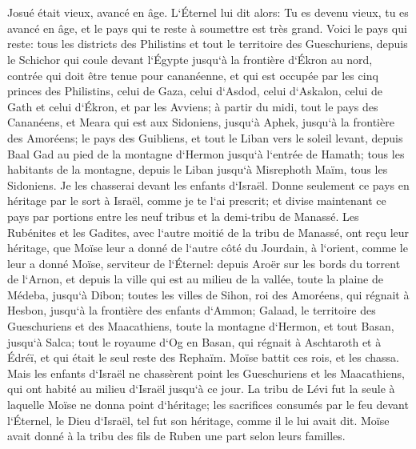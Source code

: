 \chapter{}

\verse Josué était vieux, avancé en âge. L`Éternel lui dit alors: Tu es devenu vieux, tu es avancé en âge, et le pays qui te reste à soumettre est très grand. 
\verse Voici le pays qui reste: tous les districts des Philistins et tout le territoire des Gueschuriens, 
\verse depuis le Schichor qui coule devant l`Égypte jusqu`à la frontière d`Ékron au nord, contrée qui doit être tenue pour cananéenne, et qui est occupée par les cinq princes des Philistins, celui de Gaza, celui d`Asdod, celui d`Askalon, celui de Gath et celui d`Ékron, et par les Avviens; 
\verse à partir du midi, tout le pays des Cananéens, et Meara qui est aux Sidoniens, jusqu`à Aphek, jusqu`à la frontière des Amoréens; 
\verse le pays des Guibliens, et tout le Liban vers le soleil levant, depuis Baal Gad au pied de la montagne d`Hermon jusqu`à l`entrée de Hamath; 
\verse tous les habitants de la montagne, depuis le Liban jusqu`à Misrephoth Maïm, tous les Sidoniens. Je les chasserai devant les enfants d`Israël. Donne seulement ce pays en héritage par le sort à Israël, comme je te l`ai prescrit; 
\verse et divise maintenant ce pays par portions entre les neuf tribus et la demi-tribu de Manassé. 
\verse Les Rubénites et les Gadites, avec l`autre moitié de la tribu de Manassé, ont reçu leur héritage, que Moïse leur a donné de l`autre côté du Jourdain, à l`orient, comme le leur a donné Moïse, serviteur de l`Éternel: 
\verse depuis Aroër sur les bords du torrent de l`Arnon, et depuis la ville qui est au milieu de la vallée, toute la plaine de Médeba, jusqu`à Dibon; 
\verse toutes les villes de Sihon, roi des Amoréens, qui régnait à Hesbon, jusqu`à la frontière des enfants d`Ammon; 
\verse Galaad, le territoire des Gueschuriens et des Maacathiens, toute la montagne d`Hermon, et tout Basan, jusqu`à Salca; 
\verse tout le royaume d`Og en Basan, qui régnait à Aschtaroth et à Édréï, et qui était le seul reste des Rephaïm. Moïse battit ces rois, et les chassa. 
\verse Mais les enfants d`Israël ne chassèrent point les Gueschuriens et les Maacathiens, qui ont habité au milieu d`Israël jusqu`à ce jour. 
\verse La tribu de Lévi fut la seule à laquelle Moïse ne donna point d`héritage; les sacrifices consumés par le feu devant l`Éternel, le Dieu d`Israël, tel fut son héritage, comme il le lui avait dit. 
\verse Moïse avait donné à la tribu des fils de Ruben une part selon leurs familles. 
